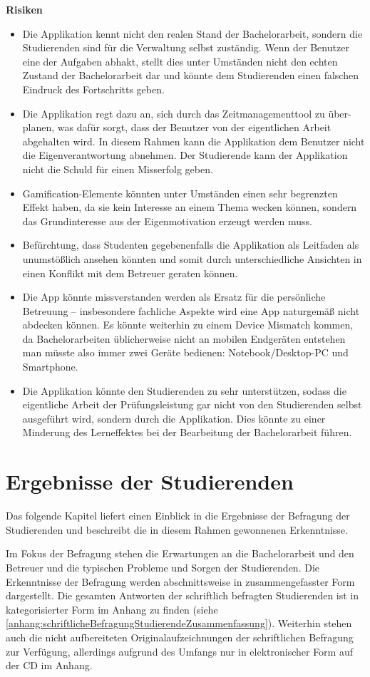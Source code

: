 \documentclass[bibliography=totoc,listof=totoc,BCOR=5mm,DIV=12,oneside]{scrbook}
\begin{document}
\newpage
\par \bigskip \textbf{Risiken}
\begin{itemize}
\item Die Applikation kennt nicht den realen Stand der Bachelorarbeit, sondern die Studierenden sind für die Verwaltung selbst zuständig. Wenn der Benutzer eine der Aufgaben abhakt, stellt dies unter Umständen nicht den echten Zustand der Bachelorarbeit dar und könnte dem Studierenden einen falschen Eindruck des Fortschritts geben.
\item Die Applikation regt dazu an, sich durch das Zeitmanagementtool zu über-planen, was dafür sorgt, dass der Benutzer von der eigentlichen Arbeit abgehalten wird. In diesem Rahmen kann die Applikation dem Benutzer nicht die Eigenverantwortung abnehmen. Der Studierende kann der Applikation nicht die Schuld für einen Misserfolg geben.
\item Gamification-Elemente könnten unter Umständen einen sehr begrenzten Effekt haben, da sie kein Interesse an einem Thema wecken können, sondern das Grundinteresse aus der Eigenmotivation erzeugt werden muss.
\item Befürchtung, dass Studenten gegebenenfalls die Applikation als Leitfaden als unumstößlich ansehen könnten und somit durch unterschiedliche Ansichten in einen Konflikt mit dem Betreuer geraten können.
\item Die App könnte missverstanden werden als Ersatz für die persönliche Betreuung – insbesondere fachliche Aspekte wird eine App naturgemäß nicht abdecken können. Es könnte weiterhin zu einem \grqq Device Mismatch\grqq{} kommen, da Bachelorarbeiten üblicherweise nicht an mobilen Endgeräten entstehen man müsste also immer zwei Geräte bedienen: Notebook/Desktop-PC und Smartphone.
\item Die Applikation könnte den Studierenden zu sehr unterstützen, sodass die eigentliche Arbeit der Prüfungsleistung gar nicht von den Studierenden selbst ausgeführt wird, sondern durch die Applikation. Dies könnte zu einer Minderung des Lerneffektes bei der Bearbeitung der Bachelorarbeit führen.

\end{itemize}

\newpage
\section{Ergebnisse der Studierenden}
\par Das folgende Kapitel liefert einen Einblick in die Ergebnisse der Befragung der Studierenden und beschreibt die in diesem Rahmen gewonnenen Erkenntnisse.
\par Im Fokus der Befragung stehen die Erwartungen an die Bachelorarbeit und den Betreuer und die typischen Probleme und Sorgen der Studierenden. Die Erkenntnisse der Befragung werden abschnittsweise in zusammengefasster Form dargestellt. Die gesamten Antworten der schriftlich befragten Studierenden ist in kategorisierter Form im Anhang zu finden (siehe \ref{anhang:schriftlicheBefragungStudierendeZusammenfassung}). Weiterhin stehen auch die nicht aufbereiteten Originalaufzeichnungen der schriftlichen Befragung zur Verfügung, allerdings aufgrund des Umfangs nur in elektronischer Form auf der CD im Anhang.
\end{document}
